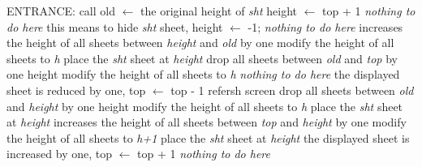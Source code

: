 \documentclass{standalone}
\begin{document}
\begin{algorithm}[H]
  \SetAlgoLined
  ENTRANCE: call \;
  {
    old $\leftarrow$ the original height of \emph{sht}\;
    {
      height $\leftarrow$ top + 1\;
    }
    {
      \emph{nothing to do here}\;
    }
    {
      this means to hide \emph{sht} sheet, height $\leftarrow$ -1;
    }
    {
      \emph{nothing to do here}\;
    }
    {
      {
        {
          increases the height of all sheets between \emph{height} and \emph{old} by one\;
          modify the height of all sheets to \emph{h}\;
        }
        place the \emph{sht} sheet at \emph{height}\;
      }
      {
        {
          {
            drop all sheets between \emph{old} and \emph{top} by one height\;
            modify the height of all sheets to \emph{h}\;
          }
        }
        {
          \emph{nothing to do here}\;
        }
        the displayed sheet is reduced by one, top $\leftarrow$ top - 1\;
      }
      refersh screen\;
    }
    {
      {
        {
          {
            drop all sheets between \emph{old} and \emph{height} by one height\;
            modify the height of all sheets to \emph{h}\;
          }
          place the \emph{sht} sheet at \emph{height}\;
        }
        {
          {
            increases the height of all sheets between \emph{top} and \emph{height} by one\;
            modify the height of all sheets to \emph{h+1}\;
          }
          place the \emph{sht} sheet at \emph{height}\;
          the displayed sheet is increased by one, top $\leftarrow$ top + 1\;
        }
      }
      {
        \emph{nothing to do here}\;
      }
    }
  }


\end{algorithm}
\end{document}
